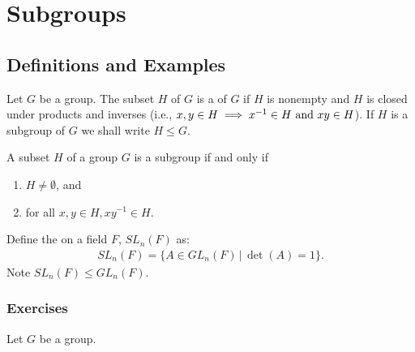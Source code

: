 \documentclass[10pt,a4paper]{report}
\begin{document}
\chapter{Subgroups}
\section{Definitions and Examples}

\begin{definition}[Subgroup]Let $G$ be a group.  The subset $H$ of $G$ is a   of $G$ if $H$ is nonempty and $H$ is closed under products and inverses (i.e., $x,y \in H\implies x^{-1} \in H\text{ and } xy \in H$).  If $H$ is a subgroup of $G$ we shall write $H \le G$.
\end{definition}

\begin{prop} A subset $H$ of a group $G$ is a subgroup if and only if 
\begin{enumerate}
	\item $H \ne \emptyset$, and 
	\item for all $x,y \in H, xy^{-1} \in H$.
\end{enumerate}
\end{prop}

\begin{definition}Define the  on a field $F$, $SL_n(F)$ as:
\begin{align*}
	SL_n(F)=\{A \in GL_n(F)\,|\, \det(A) = 1\}.
\end{align*}Note $SL_n(F) \le GL_n(F)$.
\end{definition}

\subsection{Exercises}

Let $G$ be a group.
\end{document}
